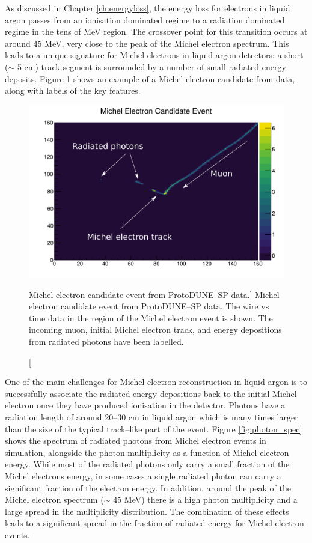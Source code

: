 As discussed in Chapter \ref{ch:energyloss}, the energy loss for electrons in
liquid argon passes from an ionisation dominated regime to a radiation dominated
regime in the tens of MeV region. The crossover point for this transition occurs
at around 45 MeV, very close to the peak of the Michel electron spectrum. This
leads to a unique signature for Michel electrons in liquid argon detectors: a
short ($\sim$ 5 cm) track segment is surrounded by a number of small radiated 
energy deposits. Figure \ref{fig:michel_event} shows an example of a Michel 
electron candidate from \protodune{} data, along with labels of the key 
features.

\begin{figure}
	\centering
	\includegraphics[width=\textwidth]{figures/michel_candidate_labelled.pdf}
	\caption
	[Michel electron candidate event from ProtoDUNE--SP data.]
	{Michel electron candidate event from ProtoDUNE--SP data. The wire vs time
	data in the region of the Michel electron event is shown.  The incoming muon,
	initial Michel electron track, and energy depositions from radiated photons
	have been labelled.}
	\label{fig:michel_event}
\end{figure}

One of the main challenges for Michel electron reconstruction in liquid argon is
to successfully associate the radiated energy depositions back to the initial
Michel electron once they have produced ionisation in the detector. Photons have
a radiation length of around 20--30 cm in liquid argon which is many times
larger than the size of the typical track--like part of the event. Figure 
\ref{fig:photon_spec} shows the spectrum of radiated photons from Michel 
electron events in \protodune{} simulation, alongside the photon multiplicity 
as a function of Michel electron energy. While most of the radiated photons 
only carry a small fraction of the Michel electrons energy, in some cases a 
single radiated photon can carry a significant fraction of the electron 
energy. In addition, around the peak of the Michel electron spectrum ($\sim$
45 MeV) there is a high photon multiplicity and a large spread in the
multiplicity distribution. The combination of these effects leads to a
significant spread in the fraction of radiated energy for Michel electron
events.

